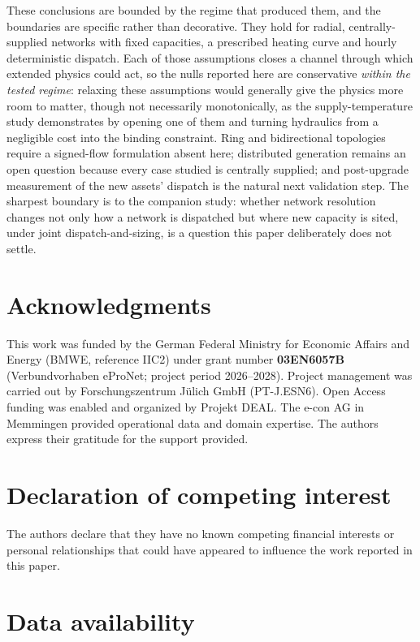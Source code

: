 \documentclass[a4paper,fleqn]{cas-sc}
\begin{document}
These conclusions are bounded by the regime that produced them, and the boundaries are
specific rather than decorative. They hold for radial, centrally-supplied networks with
fixed capacities, a prescribed heating curve and hourly deterministic dispatch. Each of
those assumptions closes a channel through which extended physics could act, so the nulls
reported here are conservative \emph{within the tested regime}: relaxing these assumptions would
generally give the physics more room to matter, though not necessarily monotonically, as the
supply-temperature study demonstrates by opening one of
them and turning hydraulics from a negligible cost into the binding constraint. Ring and
bidirectional topologies require a signed-flow formulation absent here; distributed
generation remains an open question because every case studied is centrally supplied; and
post-upgrade measurement of the new assets' dispatch is the natural next validation step.
The sharpest boundary is to the companion study: whether network resolution changes not only
how a network is dispatched but where new capacity is sited, under joint
dispatch-and-sizing, is a question this paper deliberately does not settle.

\section*{Acknowledgments}

This work was funded by the German Federal Ministry for Economic Affairs and Energy
(BMWE, reference IIC2) under grant number \textbf{03EN6057B} (Verbundvorhaben eProNet;
project period 2026--2028). Project management was carried out by Forschungszentrum
J\"ulich GmbH (PT-J.ESN6). Open Access funding was enabled and organized by Projekt DEAL.
The e-con AG in Memmingen provided operational data and domain expertise. The authors
express their gratitude for the support provided.

\section*{Declaration of competing interest}

The authors declare that they have no known competing financial interests or personal
relationships that could have appeared to influence the work reported in this paper.

\section*{Data availability}
\end{document}
